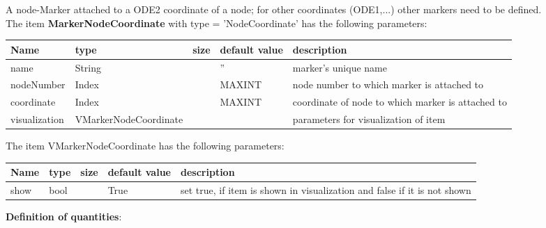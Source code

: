 A node-Marker attached to a ODE2 coordinate of a node; for other coordinates (ODE1,...) other markers need to be defined.
 \\\vspace{12pt} \noindent The item {\bf MarkerNodeCoordinate} with type = 'NodeCoordinate' has the following parameters:\vspace{-1cm}\\ 
\begin{center}
  \footnotesize
  \begin{longtable}{| p{4.5cm} | p{2.5cm} | p{0.5cm} | p{2.5cm} | p{6cm} |}
    \hline
    \bf Name & \bf type & \bf size & \bf default value & \bf description \\ \hline
    name &     String &      &     '' &     marker's unique name\\ \hline
    nodeNumber &     Index &      &     MAXINT &     node number to which marker is attached to\\ \hline
    coordinate &     Index &      &     MAXINT &     coordinate of node to which marker is attached to\\ \hline
    visualization & VMarkerNodeCoordinate & & & parameters for visualization of item \\ \hline
	  \end{longtable}
	\end{center}
The item VMarkerNodeCoordinate has the following parameters:\vspace{-1cm}\\ 
\begin{center}
  \footnotesize
  \begin{longtable}{| p{4.5cm} | p{2.5cm} | p{0.5cm} | p{2.5cm} | p{6cm} |}
    \hline
    \bf Name & \bf type & \bf size & \bf default value & \bf description \\ \hline
    show &     bool &      &     True &     set true, if item is shown in visualization and false if it is not shown\\ \hline
	  \end{longtable}
	\end{center}
{\bf Definition of quantities}:\\
\newpage

